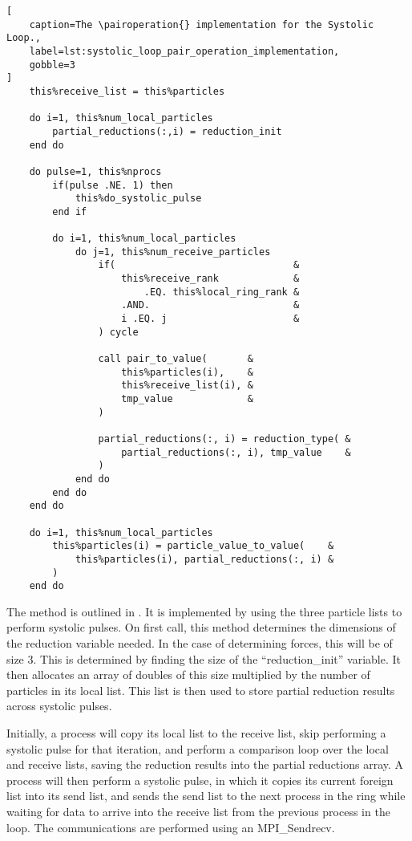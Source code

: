\begin{lstlisting}[
    caption=The \pairoperation{} implementation for the Systolic Loop.,
    label=lst:systolic_loop_pair_operation_implementation,
    gobble=3
]
    this%receive_list = this%particles

    do i=1, this%num_local_particles
        partial_reductions(:,i) = reduction_init
    end do

    do pulse=1, this%nprocs
        if(pulse .NE. 1) then
            this%do_systolic_pulse
        end if

        do i=1, this%num_local_particles
            do j=1, this%num_receive_particles
                if(                               &
                    this%receive_rank             &
                        .EQ. this%local_ring_rank &
                    .AND.                         &
                    i .EQ. j                      &
                ) cycle

                call pair_to_value(       &
                    this%particles(i),    &
                    this%receive_list(i), &
                    tmp_value             &
                )

                partial_reductions(:, i) = reduction_type( &
                    partial_reductions(:, i), tmp_value    &
                )
            end do
        end do
    end do

    do i=1, this%num_local_particles
        this%particles(i) = particle_value_to_value(    &
            this%particles(i), partial_reductions(:, i) &
        )
    end do
\end{lstlisting}

The \pairoperation{} method is outlined in
.
It is implemented by using the three
particle lists to perform systolic pulses.
%
On first call, this method determines the dimensions of the
reduction variable needed.
%
In the case of determining forces, this will be of size 3.
%
This is determined by finding the size of the ``reduction\_init''
variable.
%
It then allocates an array of doubles of this size multiplied by the
number of particles in its local list.
%
This list is then used to store partial reduction results across
systolic pulses.

Initially, a process will copy its local list to the receive list,
skip performing a systolic pulse for that iteration, and perform
a comparison loop over the local and receive lists, saving the
reduction results into the partial reductions array.
%
A process will then perform a systolic pulse, in which it copies its
current foreign list into its send list, and sends the send list to
the next process in the ring while waiting for data to arrive 
into the receive list from the previous process in the loop.
%
The communications are performed using an MPI\_Sendrecv.

